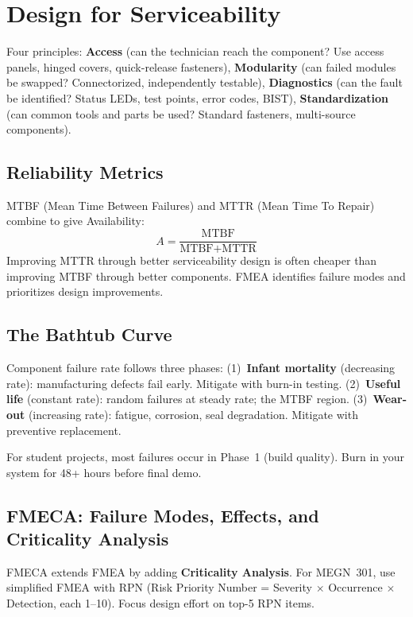 \documentclass[11pt,letterpaper,twoside,openany]{book}
\begin{document}
\section{Design for Serviceability}
Four principles: \textbf{Access} (can the technician reach the component? Use access panels, hinged covers, quick-release fasteners), \textbf{Modularity} (can failed modules be swapped? Connectorized, independently testable), \textbf{Diagnostics} (can the fault be identified? Status LEDs, test points, error codes, BIST), \textbf{Standardization} (can common tools and parts be used? Standard fasteners, multi-source components).

\subsection{Reliability Metrics}
MTBF (Mean Time Between Failures) and MTTR (Mean Time To Repair) combine to give Availability:
\[
A = \frac{\text{MTBF}}{\text{MTBF} + \text{MTTR}}
\]
Improving MTTR through better serviceability design is often cheaper than improving MTBF through better components. FMEA identifies failure modes and prioritizes design improvements.


\subsection{The Bathtub Curve}
Component failure rate follows three phases: (1)~\textbf{Infant mortality} (decreasing rate): manufacturing defects fail early. Mitigate with burn-in testing. (2)~\textbf{Useful life} (constant rate): random failures at steady rate; the MTBF region. (3)~\textbf{Wear-out} (increasing rate): fatigue, corrosion, seal degradation. Mitigate with preventive replacement.

For student projects, most failures occur in Phase~1 (build quality). Burn in your system for 48+ hours before final demo.

\subsection{FMECA: Failure Modes, Effects, and Criticality Analysis}
FMECA extends FMEA by adding \textbf{Criticality Analysis}. For MEGN~301, use simplified FMEA with RPN (Risk Priority Number = Severity $\times$ Occurrence $\times$ Detection, each 1--10). Focus design effort on top-5 RPN items.
\end{document}
